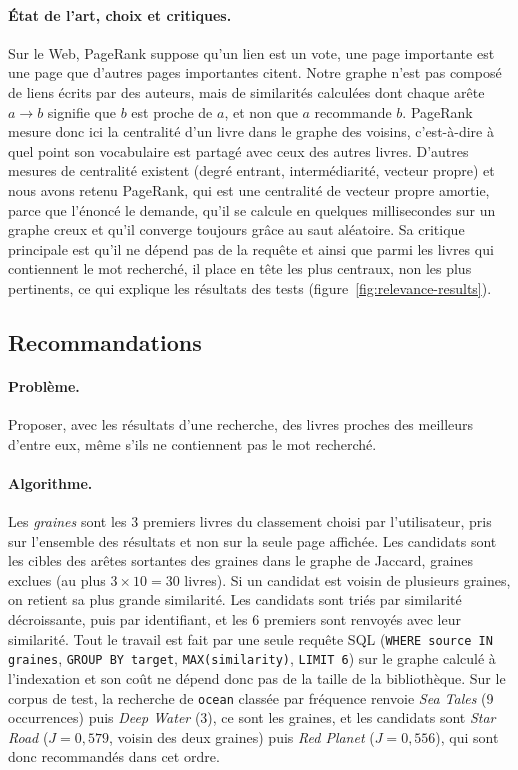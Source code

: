 \documentclass[11pt,a4paper]{article}
\begin{document}
\paragraph{État de l'art, choix et critiques.}
Sur le Web, PageRank suppose qu'un lien est un vote, une page importante est une page que d'autres pages importantes citent. Notre graphe n'est pas composé de liens écrits par des auteurs, mais de similarités calculées dont chaque arête $a \to b$ signifie que $b$ est proche de $a$, et non que $a$ recommande $b$. PageRank mesure donc ici la centralité d'un livre dans le graphe des voisins, c'est-à-dire à quel point son vocabulaire est partagé avec ceux des autres livres. D'autres mesures de centralité existent (degré entrant, intermédiarité, vecteur propre) et nous avons retenu PageRank, qui est une centralité de vecteur propre amortie, parce que l'énoncé le demande, qu'il se calcule en quelques millisecondes sur un graphe creux et qu'il converge toujours grâce au saut aléatoire. Sa critique principale est qu'il ne dépend pas de la requête et ainsi que parmi les livres qui contiennent le mot recherché, il place en tête les plus centraux, non les plus pertinents, ce qui explique les résultats des tests (figure~\ref{fig:relevance-results}).

\subsection{Recommandations}

\paragraph{Problème.}
Proposer, avec les résultats d'une recherche, des livres proches des meilleurs d'entre eux, même s'ils ne contiennent pas le mot recherché.

\paragraph{Algorithme.}
Les \emph{graines} sont les 3 premiers livres du classement choisi par l'utilisateur, pris sur l'ensemble des résultats et non sur la seule page affichée. Les candidats sont les cibles des arêtes sortantes des graines dans le graphe de Jaccard, graines exclues (au plus $3 \times 10 = 30$ livres). Si un candidat est voisin de plusieurs graines, on retient sa plus grande similarité. Les candidats sont triés par similarité décroissante, puis par identifiant, et les 6 premiers sont renvoyés avec leur similarité. Tout le travail est fait par une seule requête SQL (\texttt{WHERE source IN graines}, \texttt{GROUP BY target}, \texttt{MAX(similarity)}, \texttt{LIMIT 6}) sur le graphe calculé à l'indexation et son coût ne dépend donc pas de la taille de la bibliothèque. Sur le corpus de test, la recherche de \texttt{ocean} classée par fréquence renvoie \emph{Sea Tales} (9 occurrences) puis \emph{Deep Water} (3), ce sont les graines, et les candidats sont \emph{Star Road} ($J=0{,}579$, voisin des deux graines) puis \emph{Red Planet} ($J=0{,}556$), qui sont donc recommandés dans cet ordre.
\end{document}
